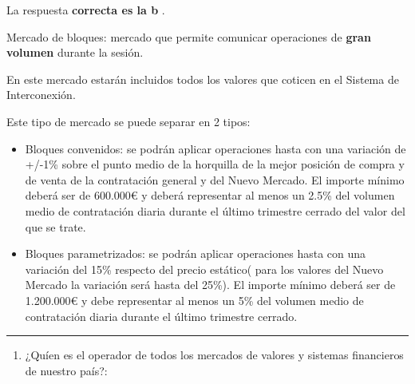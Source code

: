 \documentclass[
  letterpaper,
  DIV=11,
  numbers=noendperiod]{scrreprt}
\providecommand{\tightlist}{%
  \setlength{\itemsep}{0pt}\setlength{\parskip}{0pt}}\usepackage{longtable,booktabs,array}
\begin{document}
\begin{tcolorbox}[enhanced jigsaw, left=2mm, opacityback=0, colback=white, breakable, arc=.35mm, bottomrule=.15mm, rightrule=.15mm, toprule=.15mm, leftrule=.75mm, colframe=quarto-callout-tip-color-frame]
\begin{minipage}[t]{5.5mm}
\textcolor{quarto-callout-tip-color}{\faLightbulb}
\end{minipage}%
\begin{minipage}[t]{\textwidth - 5.5mm}

La respuesta \textbf{correcta es la b} .

Mercado de bloques: mercado que permite comunicar operaciones de
\textbf{gran volumen} durante la sesión.

En este mercado estarán incluidos todos los valores que coticen en el
Sistema de Interconexión.

Este tipo de mercado se puede separar en 2 tipos:

\begin{itemize}
\item
  Bloques convenidos: se podrán aplicar operaciones hasta con una
  variación de +/-1\% sobre el punto medio de la horquilla de la mejor
  posición de compra y de venta de la contratación general y del Nuevo
  Mercado. El importe mínimo deberá ser de 600.000€ y deberá representar
  al menos un 2.5\% del volumen medio de contratación diaria durante el
  último trimestre cerrado del valor del que se trate.
\item
  Bloques parametrizados: se podrán aplicar operaciones hasta con una
  variación del 15\% respecto del precio estático( para los valores del
  Nuevo Mercado la variación será hasta del 25\%). El importe mínimo
  deberá ser de 1.200.000€ y debe representar al menos un 5\% del
  volumen medio de contratación diaria durante el último trimestre
  cerrado.
\end{itemize}

\end{minipage}%
\end{tcolorbox}

\begin{center}\rule{0.5\linewidth}{0.5pt}\end{center}

\begin{enumerate}
\def\labelenumi{\arabic{enumi}.}
\setcounter{enumi}{33}
\tightlist
\item
  ¿Quíen es el operador de todos los mercados de valores y sistemas
  financieros de nuestro país?:
\end{enumerate}
\end{document}
